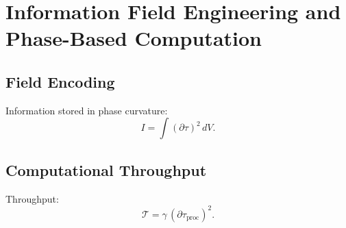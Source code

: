 \chapter{Information Field Engineering and Phase-Based Computation}

\section{Field Encoding}
Information stored in phase curvature:
\[
I = \int (\partial\tau)^2\, dV.
\]

\section{Computational Throughput}
Throughput:
\[
\mathcal{T} = \gamma\,(\partial\tau_{\mathrm{proc}})^2.
\]
